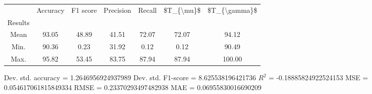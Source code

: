 \begin{tabular}{|c|c|c|c|c|c|c|}
\toprule
{} &  Accuracy &  F1 score &  Precision &  Recall &  \$T\_\{\textbackslash mu\}\$ &  \$T\_\{\textbackslash gamma\}\$ \\
Results &           &           &            &         &            &               \\
\hline
Mean    &     93.05 &     48.89 &      41.51 &   72.07 &      72.07 &         94.12 \\
Min.    &     90.36 &      0.23 &      31.92 &    0.12 &       0.12 &         90.49 \\
Max.    &     95.82 &     53.45 &      83.75 &   87.94 &      87.94 &        100.00 \\
\bottomrule
\end{tabular}

 Dev. std. accuracy = 1.2646956924937989
 Dev. std. F1-score = 8.625538196421736
 $R^2$ = -0.18885824922524153
 MSE = 0.054617061815849334
 RMSE = 0.23370293497482938
 MAE = 0.06955830016690209